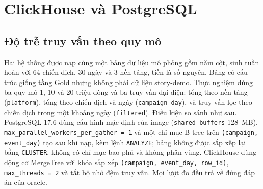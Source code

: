 \section{ClickHouse và PostgreSQL}
\label{sec:c5-clickhouse-vs-postgres}

\subsection{Độ trễ truy vấn theo quy mô}
\label{sec:c5-do-tre-truy-van}
Hai hệ thống được nạp cùng một bảng dữ liệu mô phỏng gồm năm cột, sinh tuần hoàn với 64 chiến dịch, 30 ngày và 3 nền tảng, tiền là số nguyên. Bảng có cấu trúc giống tầng Gold nhưng không phải dữ liệu story-demo. Thực nghiệm dùng ba quy mô 1, 10 và 20 triệu dòng và ba truy vấn đại diện: tổng theo nền tảng (\texttt{platform}), tổng theo chiến dịch và ngày (\texttt{campaign\_day}), và truy vấn lọc theo chiến dịch trong một khoảng ngày (\texttt{filtered}). Điều kiện so sánh như sau. PostgreSQL 17.6 dùng cấu hình mặc định của image (\texttt{shared\_buffers} 128~MB), \texttt{max\_parallel\_workers\_per\_gather = 1} và một chỉ mục B-tree trên \texttt{(campaign, event\_day)} tạo sau khi nạp, kèm lệnh \texttt{ANALYZE}; bảng không được sắp xếp lại bằng \texttt{CLUSTER}, không có chỉ mục bao phủ và không phân vùng. ClickHouse dùng động cơ MergeTree với khóa sắp xếp \texttt{(campaign, event\_day, row\_id)}, \texttt{max\_threads = 2} và tắt bộ nhớ đệm truy vấn. Mọi lượt đo đều trả về đúng đáp án của oracle.

